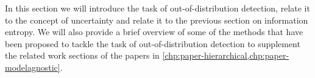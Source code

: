 

In this section we will introduce the task of out-of-distribution detection, relate it to the concept of uncertainty and relate it to the previous section on information entropy.
We will also provide a brief overview of some of the methods that have been proposed to tackle the task of out-of-distribution detection to supplement the related work sections of the papers in \cref{chp:paper-hierarchical,chp:paper-modelagnostic}. 

